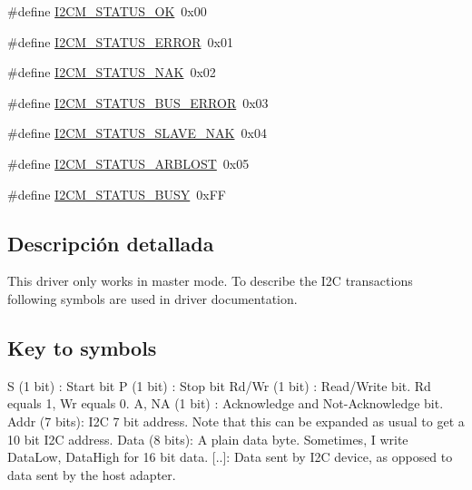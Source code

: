 \begin{DoxyCompactItemize}
\item 
\#define \hyperlink{group___i2_c_m__18_x_x__43_x_x_gaef5f7d87e3e3b72c200d978bb19205c5}{I2\+C\+M\+\_\+\+S\+T\+A\+T\+U\+S\+\_\+\+OK}~0x00
\item 
\#define \hyperlink{group___i2_c_m__18_x_x__43_x_x_ga18079f14167837fa204f54eef0c02c92}{I2\+C\+M\+\_\+\+S\+T\+A\+T\+U\+S\+\_\+\+E\+R\+R\+OR}~0x01
\item 
\#define \hyperlink{group___i2_c_m__18_x_x__43_x_x_ga3e37de80881a617b1fadceabbd9dc19f}{I2\+C\+M\+\_\+\+S\+T\+A\+T\+U\+S\+\_\+\+N\+AK}~0x02
\item 
\#define \hyperlink{group___i2_c_m__18_x_x__43_x_x_ga5ae3667cc900825fac506866f9a509d2}{I2\+C\+M\+\_\+\+S\+T\+A\+T\+U\+S\+\_\+\+B\+U\+S\+\_\+\+E\+R\+R\+OR}~0x03
\item 
\#define \hyperlink{group___i2_c_m__18_x_x__43_x_x_ga5260bc325f40a9218d0596173c996f35}{I2\+C\+M\+\_\+\+S\+T\+A\+T\+U\+S\+\_\+\+S\+L\+A\+V\+E\+\_\+\+N\+AK}~0x04
\item 
\#define \hyperlink{group___i2_c_m__18_x_x__43_x_x_ga390dc8a114c6577c494108394dad633d}{I2\+C\+M\+\_\+\+S\+T\+A\+T\+U\+S\+\_\+\+A\+R\+B\+L\+O\+ST}~0x05
\item 
\#define \hyperlink{group___i2_c_m__18_x_x__43_x_x_gafdf5fab1c97f34b2bdb9afd743822f42}{I2\+C\+M\+\_\+\+S\+T\+A\+T\+U\+S\+\_\+\+B\+U\+SY}~0x\+FF
\end{DoxyCompactItemize}


\subsection{Descripción detallada}
This driver only works in master mode. To describe the I2C transactions following symbols are used in driver documentation.

\subsection*{Key to symbols }

S (1 bit) \+: Start bit P (1 bit) \+: Stop bit Rd/\+Wr (1 bit) \+: Read/\+Write bit. Rd equals 1, Wr equals 0. A, NA (1 bit) \+: Acknowledge and Not-\/\+Acknowledge bit. Addr (7 bits)\+: I2C 7 bit address. Note that this can be expanded as usual to get a 10 bit I2C address. Data (8 bits)\+: A plain data byte. Sometimes, I write Data\+Low, Data\+High for 16 bit data. \mbox{[}..\mbox{]}\+: Data sent by I2C device, as opposed to data sent by the host adapter. 

